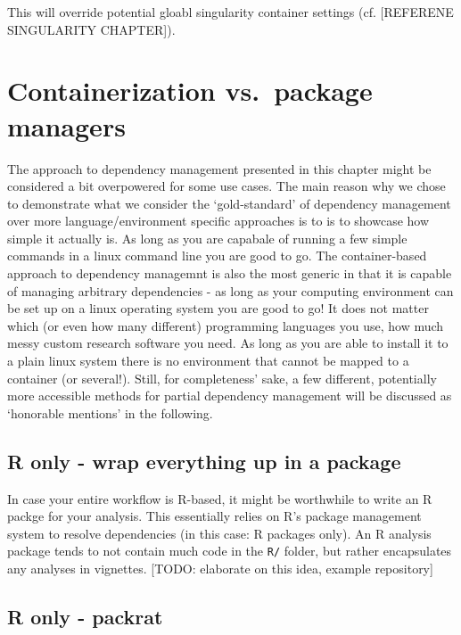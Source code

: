 \documentclass[]{book}
\begin{document}
This will override potential gloabl singularity container settings (cf.
{[}REFERENE SINGULARITY CHAPTER{]}).

\section{Containerization vs.~package
managers}\label{containerization-vs.package-managers}

The approach to dependency management presented in this chapter might be
considered a bit overpowered for some use cases. The main reason why we
chose to demonstrate what we consider the `gold-standard' of dependency
management over more language/environment specific approaches is to is
to showcase how simple it actually is. As long as you are capabale of
running a few simple commands in a linux command line you are good to
go. The container-based approach to dependency managemnt is also the
most generic in that it is capable of managing arbitrary dependencies -
as long as your computing environment can be set up on a linux operating
system you are good to go! It does not matter which (or even how many
different) programming languages you use, how much messy custom research
software you need. As long as you are able to install it to a plain
linux system there is no environment that cannot be mapped to a
container (or several!). Still, for completeness' sake, a few different,
potentially more accessible methods for partial dependency management
will be discussed as `honorable mentions' in the following.

\subsection{R only - wrap everything up in a
package}\label{r-only---wrap-everything-up-in-a-package}

In case your entire workflow is R-based, it might be worthwhile to write
an R packge for your analysis. This essentially relies on R's package
management system to resolve dependencies (in this case: R packages
only). An R analysis package tends to not contain much code in the
\texttt{R/} folder, but rather encapsulates any analyses in vignettes.
{[}TODO: elaborate on this idea, example repository{]}

\subsection{R only - packrat}\label{r-only---packrat}
\end{document}
